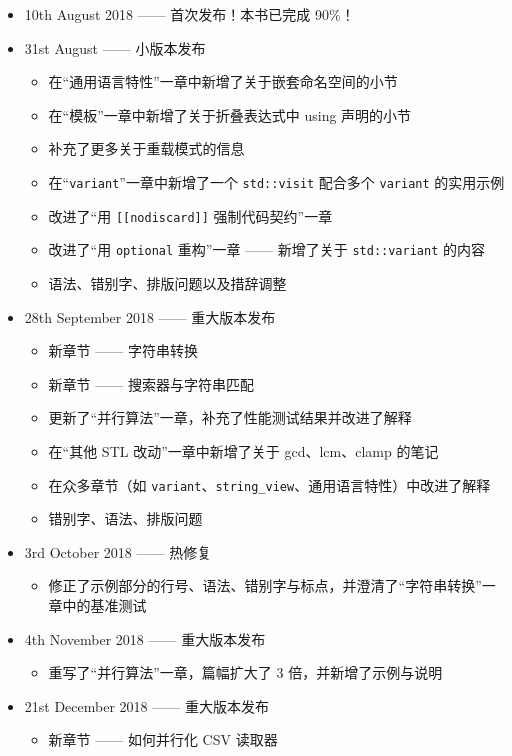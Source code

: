 \begin{itemize}
\item 10th August 2018 —— 首次发布！本书已完成 90\%！
\item 31st August —— 小版本发布
  \begin{itemize}
  \item 在“通用语言特性”一章中新增了关于嵌套命名空间的小节
  \item 在“模板”一章中新增了关于折叠表达式中 using 声明的小节
  \item 补充了更多关于重载模式的信息
  \item 在“\texttt{variant}”一章中新增了一个 \texttt{std::visit} 配合多个 \texttt{variant} 的实用示例
  \item 改进了“用 \texttt{\texttt{\texttt{[[nodiscard]]}}} 强制代码契约”一章
  \item 改进了“用 \texttt{optional} 重构”一章 —— 新增了关于 \texttt{std::variant} 的内容
  \item 语法、错别字、排版问题以及措辞调整
  \end{itemize}
\item 28th September 2018 —— 重大版本发布
  \begin{itemize}
  \item 新章节 —— 字符串转换
  \item 新章节 —— 搜索器与字符串匹配
  \item 更新了“并行算法”一章，补充了性能测试结果并改进了解释
  \item 在“其他 STL 改动”一章中新增了关于 gcd、lcm、clamp 的笔记
  \item 在众多章节（如 \texttt{variant}、\texttt{string\_view}、通用语言特性）中改进了解释
  \item 错别字、语法、排版问题
  \end{itemize}
\item 3rd October 2018 —— 热修复
  \begin{itemize}
  \item 修正了示例部分的行号、语法、错别字与标点，并澄清了“字符串转换”一章中的基准测试
  \end{itemize}
\item 4th November 2018 —— 重大版本发布
  \begin{itemize}
  \item 重写了“并行算法”一章，篇幅扩大了 3 倍，并新增了示例与说明
  \end{itemize}
\item 21st December 2018 —— 重大版本发布
  \begin{itemize}
  \item 新章节 —— 如何并行化 CSV 读取器

\end{itemize}
\end{itemize}
